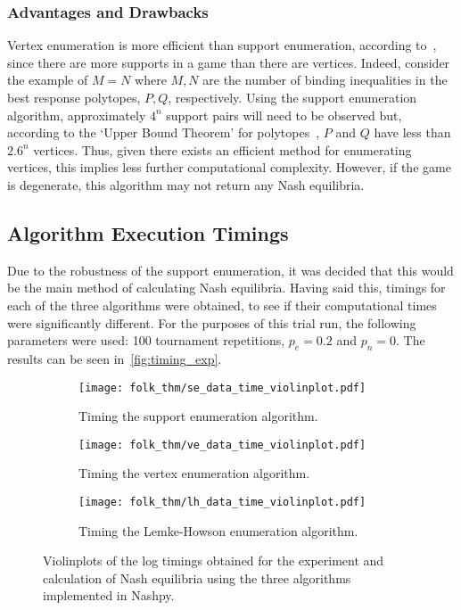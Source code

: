 \subsubsection{Advantages and Drawbacks}\label{subsubsec:Adv_and_Drawbacks}
Vertex enumeration is more efficient than support enumeration, according
to~\cite{NoamNisan2007}, since there are more supports in a game than there are
vertices. Indeed, consider the example of \(M = N\) where \(M, N\) are the
number of binding inequalities in the best response polytopes, \(P, Q\),
respectively. Using the support enumeration algorithm, approximately \(4^{n}\)
support pairs will need to be observed but, according to the `Upper Bound
Theorem' for polytopes~\cite{Alon1985,Brondsted2012,Seidel1995}, \(P\) and \(Q\) have less than \(2.6^{n}\) vertices.
Thus, given there exists an efficient method for enumerating vertices, this
implies less further computational complexity. However, if the game is
degenerate, this algorithm may not return any Nash equilibria. 

\subsection{Algorithm Execution Timings}\label{subsec:Alg_Execution_Times}
Due to the robustness of the support enumeration, it was decided that this would
be the main method of calculating Nash equilibria. Having said this, timings for
each of the three algorithms were obtained, to see
if their computational times were significantly different. For
the purposes of this trial run, the following parameters were used: 100
tournament repetitions, \(p_{e} = 0.2\) and \(p_{n} = 0\). The results can be
seen in~\autoref{fig:timing_exp}.

\begin{figure}
    \begin{subfigure}{0.3\textwidth}
        \centering
        \texttt{[image: folk\_thm/se\_data\_time\_violinplot.pdf]}
        \caption{Timing the support enumeration algorithm.}
    \end{subfigure}
    \begin{subfigure}{0.3\textwidth}
        \centering
        \texttt{[image: folk\_thm/ve\_data\_time\_violinplot.pdf]}
        \caption{Timing the vertex enumeration algorithm.}
    \end{subfigure}
    \begin{subfigure}{0.3\textwidth}
        \centering
        \texttt{[image: folk\_thm/lh\_data\_time\_violinplot.pdf]}
        \caption{Timing the Lemke-Howson enumeration algorithm.}
    \end{subfigure}
    \caption{Violinplots of the log timings obtained for the experiment and calculation of Nash equilibria using the three algorithms implemented in Nashpy.}\label{fig:timing_exp}
\end{figure}


